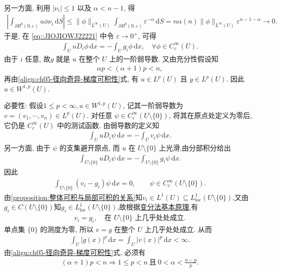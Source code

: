 \documentclass[../../main.tex]{subfiles}
\begin{document}
\begin{solution}
\begin{gather*}
\end{gather*}
另一方面, 利用 $|\nu_i|\leqslant1$ 以及 $\alpha<n-1$, 得
\begin{align*}
\left|
\int_{\partial B^{0}(0,\varepsilon)}u\phi\nu_i\,\mathrm{d}S
\right|
\leqslant
\|\phi\|_{L^\infty(U)}
\int_{\partial B^{0}(0,\varepsilon)}
\varepsilon^{-\alpha}\,\mathrm{d}S
=n\alpha(n)\|\phi\|_{L^\infty(U)}
\varepsilon^{n-1-\alpha}
\longrightarrow0.
\end{align*}
于是, 在 \eqref{eq::JIOJIOWJ22221} 中令 $\varepsilon\to0^+$, 可得
\begin{align*}
\int_UuD_i\phi\,\mathrm{d}x
=-\int_Ug_i\phi\,\mathrm{d}x,
\quad \forall \phi\in C_c^\infty(U).
\end{align*}
由于 $i$ 任意, 故$g$ 就是 $u$ 在整个 $U$ 上的一阶弱导数.
又由充分性假设知
\begin{align*}
\alpha p<(\alpha+1)p<n,
\end{align*}
再由\eqref{align:ch05-径向奇异-梯度可积性}式, 有
$u\in L^p(U)$ 且 $g\in L^p(U)$. 因此
$u\in W^{1,p}(U)$.

{\heiti 必要性:}
假设$1\leqslant p<\infty,u\in W^{1,p}(U)$, 记其一阶弱导数为
$v=(v_1,\cdots,v_n)\in L^p(U)$. 对任意
$\psi\in C_c^\infty(U\setminus\{0\})$, 将其在原点处定义为零后, 它仍是
$C_c^\infty(U)$ 中的测试函数. 由弱导数的定义知
\begin{align*}
\int_UuD_i\psi\,\mathrm{d}x
=-\int_Uv_i\psi\,\mathrm{d}x.
\end{align*}
另一方面, 由于 $\psi$ 的支集避开原点, 而 $u$ 在
$U\setminus\{0\}$ 上光滑,由分部积分给出
\begin{align*}
\int_{U\setminus \{0\}} uD_i\psi\,\mathrm{d}x
=-\int_{U\setminus \{0\}} g_i\psi\,\mathrm{d}x.
\end{align*}
因此
\begin{align*}
\int_{U\setminus\{0\}}(v_i-g_i)\psi\,\mathrm{d}x=0,
\qquad
\psi\in C_c^\infty(U\setminus\{0\}).
\end{align*}
由\cref{proposition:整体可积与局部可积的关系}知$v_i\in L^1(U)\subseteq L^1_{\mathrm{loc}}(U\setminus\{0\})$,又由$g_i\in C(U\setminus \{0\})$知$g_i\in L^1_{\mathrm{loc}}(U\setminus\{0\})$,故根据\hyperref[lemma:变分法基本原理]{变分法基本原理},有
\begin{align*}
v_i=g_i,
\quad \text{在 }U\setminus\{0\}\text{ 上几乎处处成立}.
\end{align*}
单点集 $\{0\}$ 的测度为零, 所以 $v=g$ 在整个 $U$ 上几乎处处成立. 从而
\begin{align*}
\int_U|g(x)|^p\,\mathrm{d}x
=\int_U|v(x)|^p\,\mathrm{d}x<\infty.
\end{align*}
由\eqref{align:ch05-径向奇异-梯度可积性}式, 必须有
\begin{align*}
(\alpha+1)p<n\Longrightarrow  1\leqslant p<n
\ \text{且}\
0<\alpha<\frac{n-p}{p}.
\end{align*}


\end{solution}
\end{document}
